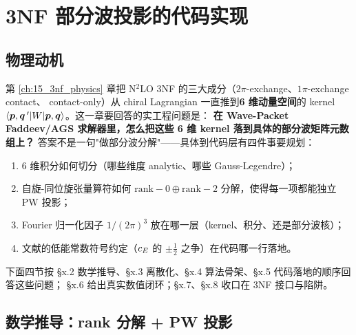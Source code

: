 
\chapter{3NF 部分波投影的代码实现}
\label{ch:16_3nf_pw_projection}

\providecommand{\rankzero}{\mathrm{rank{-}0}}
\providecommand{\ranktwo}{\mathrm{rank{-}2}}
\providecommand{\Wsymbol}{W}
\providecommand{\TNFkernel}{K_{\rm 3NF}}

\section{物理动机}
\label{sec:ch16-motivation}

第 \cref{ch:15_3nf_physics} 章把 N\(^2\)LO 3NF 的三大成分（\(2\pi\)-exchange、\(1\pi\)-exchange contact、
contact-only）从 chiral Lagrangian 一直推到\textbf{6 维动量空间}的 kernel
\(\langle \jacvec\,'|\Wsymbol|\jacvec\rangle\)。这一章要回答的实工程问题是：
\textbf{在 Wave-Packet Faddeev/AGS 求解器里，怎么把这些 6 维 kernel 落到具体的部分波矩阵元数组上？}
答案不是一句"做部分波分解"——具体到代码层有四件事要规划：

\begin{enumerate}[leftmargin=2em]
  \item 6 维积分如何切分（哪些维度 analytic、哪些 Gauss-Legendre）；
  \item 自旋-同位旋张量算符如何 \(\rankzero \oplus \ranktwo\) 分解，使得每一项都能独立 PW 投影；
  \item Fourier 归一化因子 \(1/(2\pi)^3\) 放在哪一层（kernel、积分、还是部分波核）；
  \item 文献的低能常数符号约定（\(c_E\) 的 \(\pm \tfrac12\) 之争）在代码哪一行落地。
\end{enumerate}

下面四节按 §x.2 数学推导、§x.3 离散化、§x.4 算法骨架、§x.5 代码落地的顺序回答这些问题；
§x.6 给出真实数值闭环；§x.7、§x.8 收口在 3NF 接口与陷阱。

\section{数学推导：rank 分解 + PW 投影}
\label{sec:ch16-derivation}

